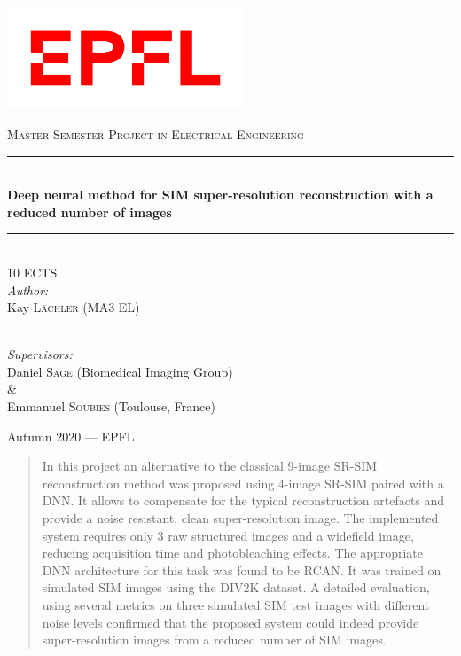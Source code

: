 \documentclass[conference]{IEEEtran}
\begin{document}
\begin{titlepage}
\begin{centering}
\newcommand{\HRule}{\rule{\linewidth}{0.5mm}}
\vspace*{\fill}
\includegraphics[width=200pt]{images/Logo_EPFL.png}

\smallskip

\textsc{\Large Master Semester Project in Electrical Engineering}
\vspace{0.5cm}\\

\HRule \\ [0.4cm]
\huge \textbf{Deep neural method for SIM super-resolution reconstruction with a reduced number of images}
\smallskip
\HRule \\[0.3cm]
\vspace*{\fill}
\Large 10 ECTS
\vspace*{\fill}
\Large{\textit{\\Author:}}\\
\Large Kay \textsc{Lächler} (MA3 EL)

\bigskip

\medskip

\Large{\textit{\\Supervisors:}}\\
\Large{Daniel \textsc{Sage} (Biomedical Imaging Group)\\\&\\Emmanuel \textsc{Soubies} (Toulouse, France)}\\

\vspace*{\fill}

\large Autumn 2020 --- EPFL

\end{centering}
\end{titlepage}

\begin{abstract}
In this project an alternative to the classical 9-image SR-SIM reconstruction method was proposed using 4-image SR-SIM paired with a DNN. It allows to compensate for the typical reconstruction artefacts and provide a noise resistant, clean super-resolution image. The implemented system requires only 3 raw structured images and a widefield image, reducing acquisition time and photobleaching effects. The appropriate DNN architecture for this task was found to be RCAN. It was trained on simulated SIM images using the DIV2K dataset. A detailed evaluation, using several metrics on three simulated SIM test images with different noise levels confirmed that the proposed system could indeed provide super-resolution images from a reduced number of SIM images.
\end{abstract}
\end{document}
